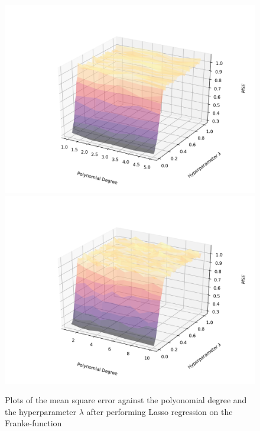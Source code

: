 \documentclass[a4paper,10pt,english]{article}
\begin{document}
\begin{figure}[H]
	\centering 
	\includegraphics[scale=0.47]{../franke_output/part_E_2.png}
	\includegraphics[scale=0.47]{../franke_output/part_E_2_highdeg.png}
	\caption{
		Plots of the mean square error against the polyonomial degree and the hyperparameter $\lambda$ after performing Lasso regression on the Franke-function 
	}
	\label{part_e2}
\end{figure}
\end{document}
